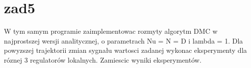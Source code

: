 \section{zad5}
\label{lab:zad5}

W tym samym programie zaimplementowac rozmyty algorytm DMC w najprostszej
wersji analitycznej, o parametrach Nu = N = D i lambda = 1. Dla powyzszej trajektorii
zmian sygnału wartosci zadanej wykonac eksperymenty dla róznej 3 regulatorów
lokalnych. Zamiescic wyniki eksperymentów.

%    



\newpage
